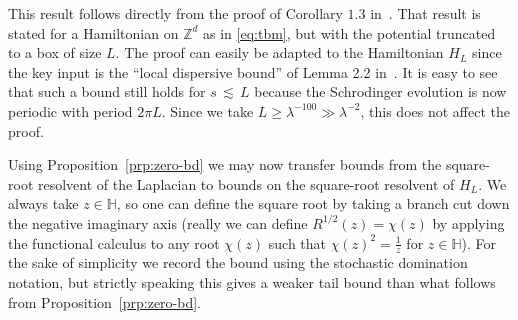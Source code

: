 \documentclass[11pt]{amsart}
\def\bbH{{\mathbb H}}
\def\Z{{\mathbb{Z}}}
\def\lsim{{\,\lesssim\,}}
\numberwithin{equation}{section}
\numberwithin{theorem}{section}
\begin{document}
This result follows directly from the proof of Corollary $1.3$ in~\cite{BDH}. That result is stated for a Hamiltonian on $\Z^d$ as in \eqref{eq:tbm}, but with the potential truncated to a box of size $L$. The proof can easily be adapted to the Hamiltonian $H_L$ since the key input is the ``local dispersive bound'' of Lemma 2.2 in~\cite{BDH}. It is easy to see that such a bound still holds for
$s\lsim L$ because the Schrodinger evolution is now periodic with period $2\pi L$.  Since we take $L \geq \lambda^{-100} \gg \lambda^{-2}$, this does not affect the proof.

Using Proposition~\ref{prp:zero-bd} we may now transfer bounds from the square-root resolvent of the Laplacian to bounds
on the square-root resolvent of $H_L$.  We always take $z\in\bbH$, so one can define the square root by taking a branch cut down the negative imaginary axis (really we can define $R^{1/2}(z) =\chi(z)$ by applying the functional calculus to any root $\chi(z)$ such that $\chi(z)^2 = \frac{1}{z}$ for $z\in\bbH$).
For the sake of simplicity we record the bound using the stochastic domination notation, but strictly speaking this gives a weaker tail bound than what follows from Proposition~\ref{prp:zero-bd}.
\end{document}
